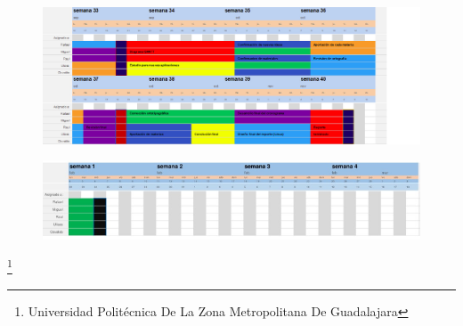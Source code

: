 \documentclass[11pt,a4paper]{article}
\begin{document}
\newpage
\begin{figure}[hbtp]
\centering
\includegraphics[scale=0.5]{Pictures/diagrama2.jpeg}
\end{figure}

\begin{figure}[hbtp]
 \centering
  \includegraphics[scale=0.90]{Pictures/Diagrama(03).png} 
 \end{figure}
 
 \footnote{Universidad Politécnica De La Zona Metropolitana De Guadalajara} 
\newpage
\end{document}
